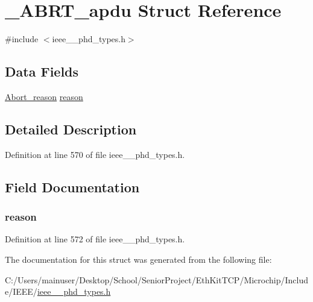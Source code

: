 \hypertarget{struct___a_b_r_t__apdu}{}\section{\+\_\+\+A\+B\+R\+T\+\_\+apdu Struct Reference}
\label{struct___a_b_r_t__apdu}


{\ttfamily \#include $<$ieee\+\_\+\_\+phd\+\_\+types.\+h$>$}

\subsection*{Data Fields}
\begin{DoxyCompactItemize}
\item 
\hyperlink{ieee__11073__phd__types_8h_a40eae8030f516ca2a5332e6977c818e5}{Abort\+\_\+reason} \hyperlink{struct___a_b_r_t__apdu_afadd9f00b39d143e4e26c7e57f1469d8}{reason}
\end{DoxyCompactItemize}


\subsection{Detailed Description}


Definition at line 570 of file ieee\+\_\+\_\+phd\+\_\+types.\+h.



\subsection{Field Documentation}
\hypertarget{struct___a_b_r_t__apdu_afadd9f00b39d143e4e26c7e57f1469d8}{}
\subsubsection[{reason}]{ reason}\label{struct___a_b_r_t__apdu_afadd9f00b39d143e4e26c7e57f1469d8}


Definition at line 572 of file ieee\+\_\+\_\+phd\+\_\+types.\+h.



The documentation for this struct was generated from the following file\+:\begin{DoxyCompactItemize}
\item 
C\+:/\+Users/mainuser/\+Desktop/\+School/\+Senior\+Project/\+Eth\+Kit\+T\+C\+P/\+Microchip/\+Include/\+I\+E\+E\+E/\hyperlink{ieee__11073__phd__types_8h}{ieee\+\_\+\_\+phd\+\_\+types.\+h}\end{DoxyCompactItemize}

